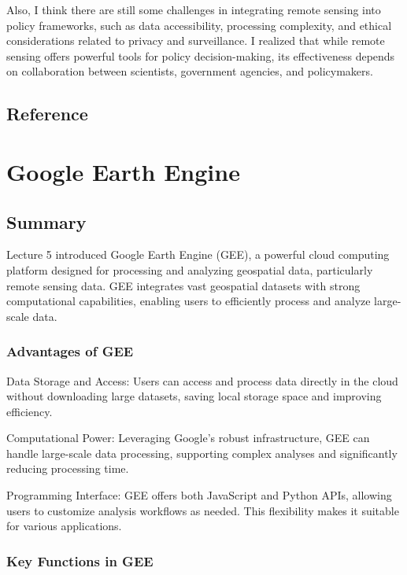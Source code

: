 \documentclass[
  letterpaper,
]{scrbook}
\begin{document}
Also, I think there are still some challenges in integrating remote
sensing into policy frameworks, such as data accessibility, processing
complexity, and ethical considerations related to privacy and
surveillance. I realized that while remote sensing offers powerful tools
for policy decision-making, its effectiveness depends on collaboration
between scientists, government agencies, and policymakers.

\section{Reference}\label{reference-2}


\chapter{Google Earth Engine}\label{google-earth-engine}

\section{Summary}\label{summary-3}

Lecture 5 introduced Google Earth Engine (GEE), a powerful cloud
computing platform designed for processing and analyzing geospatial
data, particularly remote sensing data. GEE integrates vast geospatial
datasets with strong computational capabilities, enabling users to
efficiently process and analyze large-scale data.

\subsection{Advantages of GEE}\label{advantages-of-gee}

Data Storage and Access: Users can access and process data directly in
the cloud without downloading large datasets, saving local storage space
and improving efficiency.

Computational Power: Leveraging Google's robust infrastructure, GEE can
handle large-scale data processing, supporting complex analyses and
significantly reducing processing time.

Programming Interface: GEE offers both JavaScript and Python APIs,
allowing users to customize analysis workflows as needed. This
flexibility makes it suitable for various applications.

\subsection{Key Functions in GEE}\label{key-functions-in-gee}
\end{document}
